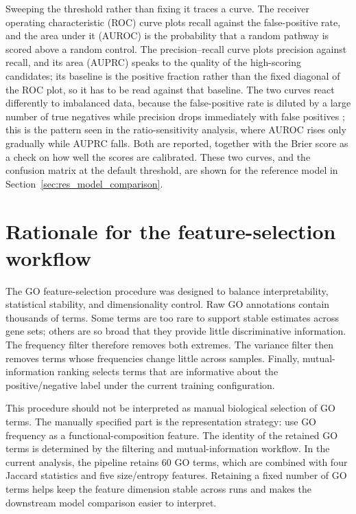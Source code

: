 \documentclass[12pt,letterpaper,oneside,openany]{book}
\begin{document}
Sweeping the threshold rather than fixing it traces a curve. The receiver operating characteristic (ROC) curve plots recall against the false-positive rate, and the area under it (AUROC) is the probability that a random pathway is scored above a random control. The precision--recall curve plots precision against recall, and its area (AUPRC) speaks to the quality of the high-scoring candidates; its baseline is the positive fraction rather than the fixed diagonal of the ROC plot, so it has to be read against that baseline. The two curves react differently to imbalanced data, because the false-positive rate is diluted by a large number of true negatives while precision drops immediately with false positives \citep{saito2015precision}; this is the pattern seen in the ratio-sensitivity analysis, where AUROC rises only gradually while AUPRC falls. Both are reported, together with the Brier score as a check on how well the scores are calibrated. These two curves, and the confusion matrix at the default threshold, are shown for the reference model in Section~\ref{sec:res_model_comparison}.

\section{Rationale for the feature-selection workflow}
\label{sec:methods_feature_rationale}

The GO feature-selection procedure was designed to balance interpretability, statistical stability, and dimensionality control. Raw GO annotations contain thousands of terms. Some terms are too rare to support stable estimates across gene sets; others are so broad that they provide little discriminative information. The frequency filter therefore removes both extremes. The variance filter then removes terms whose frequencies change little across samples. Finally, mutual-information ranking selects terms that are informative about the positive/negative label under the current training configuration.

This procedure should not be interpreted as manual biological selection of GO terms. The manually specified part is the representation strategy: use GO frequency as a functional-composition feature. The identity of the retained GO terms is determined by the filtering and mutual-information workflow. In the current analysis, the pipeline retains 60 GO terms, which are combined with four Jaccard statistics and five size/entropy features. Retaining a fixed number of GO terms helps keep the feature dimension stable across runs and makes the downstream model comparison easier to interpret.
\end{document}
